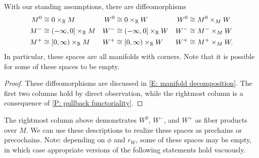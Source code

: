\begin{lemma}\label{L: pm0 as fiber products}
	With our standing assumptions, there are diffeomorphisms
	\begin{align*}
		M^0 & \cong 0 \times_{\mathbb{R}} M &W^0 & \cong 0 \times_{\mathbb{R}} W & W^0& \cong M^0 \times_M W \\
		M^- & \cong (-\infty,0] \times_{\mathbb{R}} M &W^- & \cong (-\infty,0] \times_{\mathbb{R}} W& W^-  &\cong M^- \times_M W\\
		M^+ & \cong [0,\infty) \times_{\mathbb{R}} M & W^+ & \cong [0,\infty) \times_{\mathbb{R}} W& W^+ &\cong M^+ \times_M W.
	\end{align*}
	In particular, these spaces are all manifolds with corners.
	Note that it is possible for some of these spaces to be empty.
\end{lemma}
\begin{proof}
	These diffeomorphisms are discussed in \cref{E: manifold decomposition}.
	The first two columns hold by direct observation, while the rightmost column is a consequence of \cref{P: pullback functoriality}.
\end{proof}

The rightmost column above demonstrates $W^0$, $W^-$, and $W^+$ as fiber products over $M$.
We can use these descriptions to realize these spaces as prechains or precochains.
Note: depending on $\phi$ and $r_W$, some of these spaces may be empty, in which case appropriate versions of the following statements hold vacuously.

